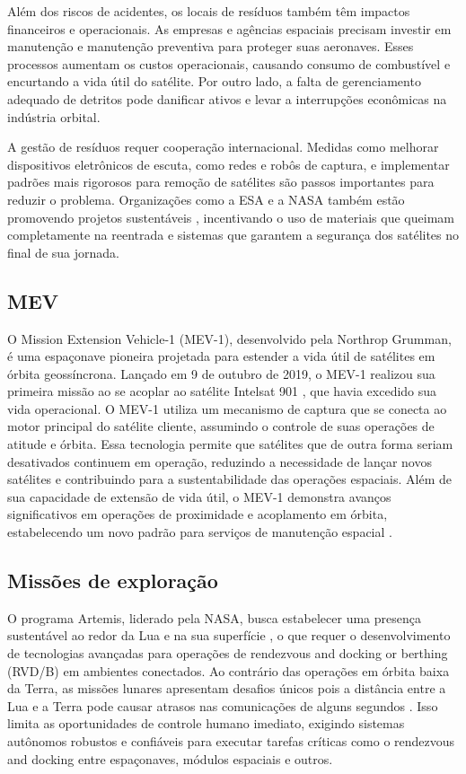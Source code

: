Além dos riscos de acidentes, os locais de resíduos também têm impactos financeiros e operacionais. As empresas e agências espaciais precisam investir em manutenção e manutenção preventiva para proteger suas aeronaves. Esses processos aumentam os custos operacionais, causando consumo de combustível e encurtando a vida útil do satélite. Por outro lado, a falta de gerenciamento adequado de detritos pode danificar ativos e levar a interrupções econômicas na indústria orbital.

A gestão de resíduos requer cooperação internacional. Medidas como melhorar dispositivos eletrônicos de escuta, como redes e robôs de captura, e implementar padrões mais rigorosos para remoção de satélites são passos importantes para reduzir o problema. Organizações como a ESA e a NASA também estão promovendo projetos sustentáveis \cite{esaDebrisMitigation2023}, incentivando o uso de materiais que queimam completamente na reentrada e sistemas que garantem a segurança dos satélites no final de sua jornada.

\subsection{MEV}

O Mission Extension Vehicle-1 (MEV-1), desenvolvido pela Northrop Grumman, é uma espaçonave pioneira projetada para estender a vida útil de satélites em órbita geossíncrona. Lançado em 9 de outubro de 2019, o MEV-1 realizou sua primeira missão ao se acoplar ao satélite Intelsat 901 \cite{nytMEV1}, que havia excedido sua vida operacional. O MEV-1 utiliza um mecanismo de captura que se conecta ao motor principal do satélite cliente, assumindo o controle de suas operações de atitude e órbita. Essa tecnologia permite que satélites que de outra forma seriam desativados continuem em operação, reduzindo a necessidade de lançar novos satélites e contribuindo para a sustentabilidade das operações espaciais. Além de sua capacidade de extensão de vida útil, o MEV-1 demonstra avanços significativos em operações de proximidade e acoplamento em órbita, estabelecendo um novo padrão para serviços de manutenção espacial \cite{mev1}.

\subsection{Missões de exploração}

O programa Artemis, liderado pela NASA, busca estabelecer uma presença sustentável ao redor da Lua e na sua superfície \cite{nasaArtemis}, o que requer o desenvolvimento de tecnologias avançadas para operações de rendezvous and docking or berthing (RVD/B) em ambientes conectados. Ao contrário das operações em órbita baixa da Terra, as missões lunares apresentam desafios únicos pois a distância entre a Lua e a Terra pode causar atrasos nas comunicações de alguns segundos \cite{keeports2006}. Isso limita as oportunidades de controle humano imediato, exigindo sistemas autônomos robustos e confiáveis para executar tarefas críticas como o rendezvous and docking entre espaçonaves, módulos espaciais e outros.


